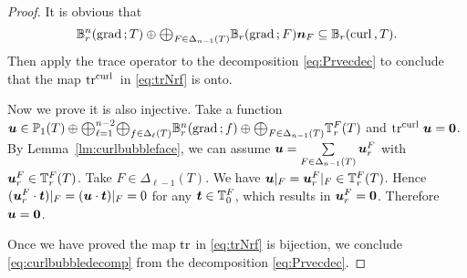 \documentclass[10pt]{amsart}
\newcommand{\Oplus}{\ensuremath{\vcenter{\hbox{\scalebox{1.5}{$\oplus$}}}}}
\begin{document}
\begin{proof}
It is obvious that
$$
\mathbb B_r^n(\grad; T) \oplus \Oplus_{F\in \Delta_{n-1}(T)} \mathbb B_r(\grad; F)\bs n_F \subseteq \mathbb B_{r}(\curl,T).
$$
Then apply the trace operator to the decomposition \eqref{eq:Prvecdec} to conclude that 
the map $\operatorname{tr}^{{\rm curl\,}}$ in \eqref{eq:trNrf} is onto. 

Now we prove it is also injective. Take a function $\bs u\in  \mathbb P_1(T)\oplus  \Oplus_{\ell = 1}^{n-2}\Oplus_{f\in \Delta_{\ell}(T)} \mathbb B_r^n(\grad; f)\oplus \Oplus_{F\in \Delta_{n-1}(T)}  \mathbb{T}^F_r( T)$ and $\operatorname{tr}^{{\rm curl\,}} \boldsymbol u =\boldsymbol 0$. By Lemma~\ref{lm:curlbubbleface}, we can assume $\boldsymbol u=\sum\limits_{F\in \Delta_{n-1}(T)}\boldsymbol u_r^F$ with $\boldsymbol u_r^F \in \mathbb{T}^F_r(T)$.
Take $F\in \Delta_{\ell-1}(T)$. We have $\boldsymbol u|_F=\boldsymbol u_r^F|_F\in\mathbb{T}^F_r(T)$. Hence $(\boldsymbol u_r^F\cdot\boldsymbol t)|_F=(\boldsymbol u\cdot\boldsymbol t)|_F=0$ for any $\boldsymbol t\in\mathbb T_0^F$, which results in $\boldsymbol u_r^F=\boldsymbol0$. Therefore $\boldsymbol u = \boldsymbol0$.  


Once we have proved the map $\operatorname{tr}$ in \eqref{eq:trNrf} is bijection, we conclude \eqref{eq:curlbubbledecomp} from the decomposition \eqref{eq:Prvecdec}. 
\end{proof}
\end{document}
